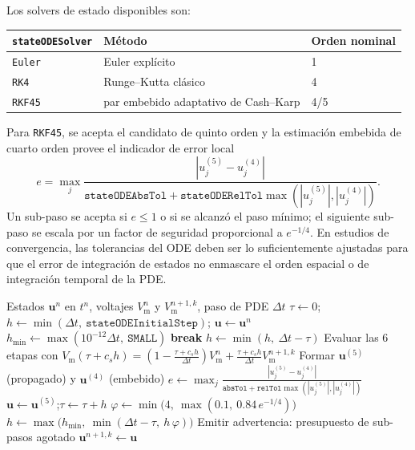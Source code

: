 \documentclass[11pt,a4paper]{article}
\newcommand{\code}[1]{\texttt{\small #1}}
\newcommand{\Vm}{V_{\text{m}}}
\begin{document}
Los solvers de estado disponibles son:
\begin{center}
\begin{tabular}{@{}lll@{}}
\toprule
\code{stateODESolver} & Método & Orden nominal \\
\midrule
\code{Euler} & Euler explícito & 1 \\
\code{RK4} & Runge--Kutta clásico & 4 \\
\code{RKF45} & par embebido adaptativo de Cash–Karp  & 4/5 \\
\bottomrule
\end{tabular}
\end{center}
Para \code{RKF45}, se acepta el candidato de quinto orden y la estimación embebida de cuarto
orden provee el indicador de error local
\begin{equation}
  e =
  \max_j
  \frac{|u^{(5)}_j-u^{(4)}_j|}
       {\texttt{stateODEAbsTol}+
        \texttt{stateODERelTol}\max(|u^{(5)}_j|,|u^{(4)}_j|)}.
\end{equation}
Un sub-paso se acepta si $e\le 1$ o si se alcanzó el paso mínimo; el siguiente sub-paso se
escala por un factor de seguridad proporcional a $e^{-1/4}$. En estudios de convergencia,
las tolerancias del ODE deben ser lo suficientemente ajustadas para que el error de
integración de estados no enmascare el orden espacial o de integración temporal de la PDE.

\begin{algorithm}[h!]
	\caption{Control de sub-paso adaptativo del par embebido 5(4) dentro de un
		paso de tiempo de la PDE}
	\label{alg:rkf45}
	\begin{algorithmic}[1]
		\Require Estados $\mathbf{u}^n$ en $t^n$, voltajes $\Vm^n$ y $\Vm^{n+1,k}$, paso de PDE $\Delta t$
		\State $\tau \gets 0$;\quad
		$h \gets \min(\Delta t,\ \texttt{stateODEInitialStep})$;\quad
		$\mathbf{u} \gets \mathbf{u}^n$
		\State $h_{\min} \gets \max(10^{-12}\Delta t,\ \texttt{SMALL})$
		 \State \textbf{break} \EndIf
		\State $h \gets \min(h,\ \Delta t-\tau)$
		\State Evaluar las 6 etapas con $\Vm(\tau+c_sh)=(1-\tfrac{\tau+c_sh}{\Delta t})\Vm^n+\tfrac{\tau+c_sh}{\Delta t}\Vm^{n+1,k}$
		\State Formar $\mathbf{u}^{(5)}$ (propagado) y $\mathbf{u}^{(4)}$ (embebido)
		\State $e \gets \displaystyle\max_{j}
		\frac{|u^{(5)}_j-u^{(4)}_j|}
		{\texttt{absTol}+\texttt{relTol}\max(|u^{(5)}_j|,|u^{(4)}_j|)}$
		\State $\mathbf{u} \gets \mathbf{u}^{(5)}$;\quad $\tau \gets \tau + h$
		\Else
		\EndIf
		\State $\varphi \gets \min\!\big(4,\ \max(0.1,\ 0.84\,e^{-1/4})\big)$
		\State $h \gets \max\!\big(h_{\min},\ \min(\Delta t-\tau,\ h\,\varphi)\big)$
		\EndFor
		\State Emitir advertencia: presupuesto de sub-pasos agotado
		\EndIf
		\Ensure $\mathbf{u}^{n+1,k} \gets \mathbf{u}$
	\end{algorithmic}
\end{algorithm}
\end{document}
